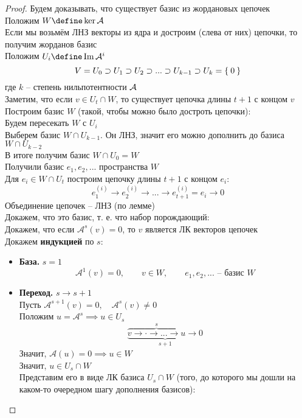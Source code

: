 \begin{proof}
	Будем доказывать, что существует базис из жордановых цепочек \\
	Положим $ W \define \ker \mathcal{A} $ \\
	Если мы возьмём ЛНЗ векторы из ядра и достроим (слева от них) цепочки, то получим жорданов базис \\
	Положим $ U_i \define \Img \mathcal{A}^i $
	$$ V = U_0 \supset U_1 \supset U_2 \supset ... \supset U_{k - 1} \supset U_k = \Set{0} $$
	где $ k $ -- степень нильпотентности $ \mathcal{A} $ \\
	Заметим, что если $ v \in U_t \cap W $, то существует цепочка длины $ t + 1 $ с концом $ v $ \\
	Построим базис $ W $ (такой, чтобы можно было достроть цепочки): \\
	Будем пересекать $ W $ с $ U_i $ \\
	Выберем базис $ W \cap U_{k - 1} $. Он ЛНЗ, значит его можно дополнить до базиса $ W \cap U_{k - 2} $ \\
	В итоге получим базис $ W \cap U_0 = W $ \\
	Получили базис $ e_1, e_2, ... $ пространства $ W $ \\
	Для $ e_i \in W \cap U_t $ построим цепочку длины $ t + 1 $ с концом $ e_i $:
	$$ e_1^{(i)} \to e_2^{(i)} \to ... \to e_{t + 1}^{(i)} = e_i \to 0 $$
	Объединение цепочек -- ЛНЗ (по лемме) \\
	Докажем, что это базис, т. е. что набор порождающий: \\
	Докажем, что если $ \mathcal{A}^s(v) = 0 $, то $ v $ является ЛК векторов цепочек \\
	Докажем \textbf{индукцией} по $ s $:
	\begin{itemize}
		\item \textbf{База.} $ s = 1 $
		$$ \mathcal{A}^1(v) = 0, \qquad v \in W, \qquad e_1, e_2, ... \text{ -- базис } W $$
		\item \textbf{Переход.} $ s \to s + 1 $ \\
		Пусть $ \mathcal{A}^{s + 1}(v) = 0, \quad \mathcal{A}^s(v) \ne 0 $ \\
		Положим $ u = \mathcal{A}^s \implies u \in U_s $
		$$ \underbrace{\overbrace{v \to \cdot \to ... \to u}^s \to 0}_{s + 1} $$
		Значит, $ \mathcal{A}(u) = 0 \implies u \in W $ \\
		Значит, $ u \in U_s \cap W $ \\
		Представим его в виде ЛК базиса $ U_s \cap W $ (того, до которого мы дошли на каком-то очередном шагу дополнения базисов):

\end{itemize}
\end{proof}
